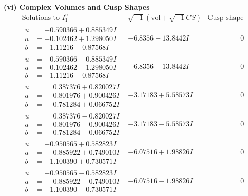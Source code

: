 \documentclass[1p]{elsarticle_modified}
\theoremstyle{definition}
\newcommand{\I}{\sqrt{-1}}
\begin{document}
\newpage\flushleft \textbf{(vi) Complex Volumes and Cusp Shapes}
$$\begin{array}{c|c|c}  
\text{Solutions to }I^u_{1}& \I (\text{vol} + \sqrt{-1}CS) & \text{Cusp shape}\\
 \hline 
\begin{aligned}
u &= -0.590366 + 0.885349 I \\
a &= -0.102462 + 1.298050 I \\
b &= -1.11216 + 0.87568 I\end{aligned}
 & -6.8356 - 13.8442 I & \phantom{-0.000000 } 0 \\ \hline\begin{aligned}
u &= -0.590366 - 0.885349 I \\
a &= -0.102462 - 1.298050 I \\
b &= -1.11216 - 0.87568 I\end{aligned}
 & -6.8356 + 13.8442 I & \phantom{-0.000000 } 0 \\ \hline\begin{aligned}
u &= \phantom{-}0.387376 + 0.820027 I \\
a &= \phantom{-}0.801976 + 0.900426 I \\
b &= \phantom{-}0.781284 + 0.066752 I\end{aligned}
 & -3.17183 + 5.58573 I & \phantom{-0.000000 } 0 \\ \hline\begin{aligned}
u &= \phantom{-}0.387376 - 0.820027 I \\
a &= \phantom{-}0.801976 - 0.900426 I \\
b &= \phantom{-}0.781284 - 0.066752 I\end{aligned}
 & -3.17183 - 5.58573 I & \phantom{-0.000000 } 0 \\ \hline\begin{aligned}
u &= -0.950565 + 0.582823 I \\
a &= \phantom{-}0.885922 + 0.749010 I \\
b &= -1.100390 + 0.730571 I\end{aligned}
 & -6.07516 + 1.98826 I & \phantom{-0.000000 } 0 \\ \hline\begin{aligned}
u &= -0.950565 - 0.582823 I \\
a &= \phantom{-}0.885922 - 0.749010 I \\
b &= -1.100390 - 0.730571 I\end{aligned}
 & -6.07516 - 1.98826 I & \phantom{-0.000000 } 0 \\ \hline\begin{aligned}

\end{aligned}
\end{array}$$
\end{document}
